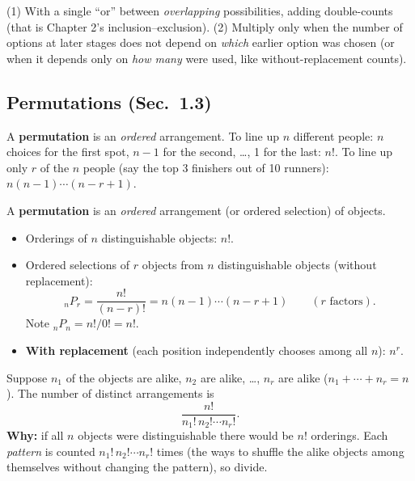 \documentclass[11pt]{article}
\let\oldsubsection\subsection
\renewcommand{\subsection}{\Needspace{14\baselineskip}\oldsubsection}
\begin{document}
\begin{warnbox}
(1) With a single ``or'' between \emph{overlapping} possibilities, adding double-counts (that is Chapter 2's inclusion--exclusion). (2) Multiply only when the number of options at later stages does not depend on \emph{which} earlier option was chosen (or when it depends only on \emph{how many} were used, like without-replacement counts).
\end{warnbox}

\subsection{Permutations (Sec.\ 1.3)}

\begin{ideabox}
A \textbf{permutation} is an \emph{ordered} arrangement. To line up $n$ different people: $n$ choices for the first spot, $n-1$ for the second, \dots, 1 for the last: $n!$. To line up only $r$ of the $n$ people (say the top 3 finishers out of 10 runners): $n(n-1)\cdots(n-r+1)$.
\end{ideabox}

\begin{defbox}
A \textbf{permutation} is an \emph{ordered} arrangement (or ordered selection) of objects.
\begin{itemize}
\item Orderings of $n$ distinguishable objects: $n!$.
\item Ordered selections of $r$ objects from $n$ distinguishable objects (without replacement):
\[ {}_nP_r=\frac{n!}{(n-r)!}=n(n-1)\cdots(n-r+1)\qquad(r\text{ factors}).\]
Note ${}_nP_n=n!/0!=n!$.
\item \textbf{With replacement} (each position independently chooses among all $n$): $n^r$.
\end{itemize}
\end{defbox}

\begin{thmbox}
Suppose $n_1$ of the objects are alike, $n_2$ are alike, \dots, $n_r$ are alike ($n_1+\cdots+n_r=n$). The number of distinct arrangements is
\[ \frac{n!}{n_1!\,n_2!\cdots n_r!}. \]
\textbf{Why:} if all $n$ objects were distinguishable there would be $n!$ orderings. Each \emph{pattern} is counted $n_1!\,n_2!\cdots n_r!$ times (the ways to shuffle the alike objects among themselves without changing the pattern), so divide.
\end{thmbox}
\end{document}
